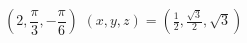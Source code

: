 {$\left( 2, \dfrac{\pi}{3}, -\dfrac{\pi}{6} \right)$
}
{$(x,y,z) = \left( \frac{1}{2}, \frac{\sqrt{3}}{2}, \sqrt{3} \right)$}